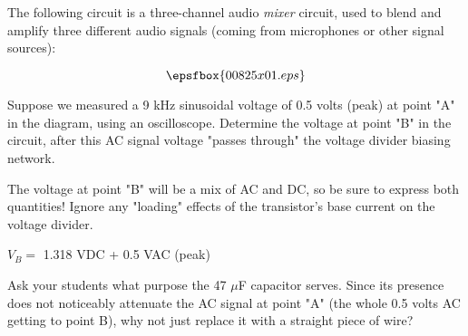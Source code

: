 

The following circuit is a three-channel audio {\it mixer} circuit, used to blend and amplify three different audio signals (coming from microphones or other signal sources):

$$\epsfbox{00825x01.eps}$$

Suppose we measured a 9 kHz sinusoidal voltage of 0.5 volts (peak) at point "A" in the diagram, using an oscilloscope.  Determine the voltage at point "B" in the circuit, after this AC signal voltage "passes through" the voltage divider biasing network.  

The voltage at point "B" will be a mix of AC and DC, so be sure to express both quantities!  Ignore any "loading" effects of the transistor's base current on the voltage divider.







$V_B =$ 1.318 VDC + 0.5 VAC (peak)







Ask your students what purpose the 47 $\mu$F capacitor serves.  Since its presence does not noticeably attenuate the AC signal at point "A" (the whole 0.5 volts AC getting to point B), why not just replace it with a straight piece of wire?




